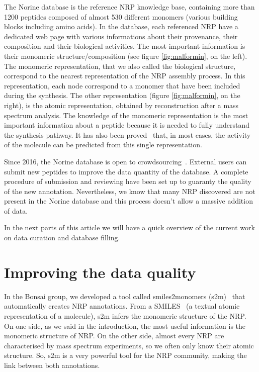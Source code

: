 \documentclass[long, final]{jobim2017}
\begin{document}
The Norine database is the reference NRP knowledge base, containing more than 1200 peptides composed of almost 530 different monomers (various building blocks including amino acids).
In the database, each referenced NRP have a dedicated web page with various informations about their provenance, their composition and their biological activities.
The most important information is their monomeric structure/composition (see figure \ref{fig:malformin}, on the left).
The monomeric representation, that we also called the biological structure, correspond to the nearest representation of the NRP assembly process.
In this representation, each node correspond to a monomer that have been included during the synthesis.
The other representation (figure \ref{fig:malformin}, on the right), is the atomic representation, obtained by reconstruction after a mass spectrum analysis.
The knowledge of the monomeric representation is the most important information about a peptide because it is needed to fully understand the synthesis pathway.
It has also been proved~\cite{abdo_new_2012} that, in most cases, the activity of the molecule can be predicted from this single representation.

Since 2016, the Norine database is open to crowdsourcing~\cite{flissi_norine_2016}.
External users can submit new peptides to improve the data quantity of the database.
A complete procedure of submission and reviewing have been set up to guaranty the quality of the new annotation.
Nevertheless, we know that many NRP discovered are not present in the Norine database and this process doesn't allow a massive addition of data.

In the next parts of this article we will have a quick overview of the current work on data curation and database filling.


\section{Improving the data quality}

In the Bonsai group, we developed a tool called smiles2monomers (s2m)~\cite{dufresne_smiles2monomers:_2015} that automatically creates NRP annotations.
From a SMILES~\cite{weininger_smiles_1988} (a textual atomic representation of a molecule), s2m infers the monomeric structure of the NRP.
On one side, as we said in the introduction, the most useful information is the monomeric structure of NRP.
On the other side, almost every NRP are characterised by mass spectrum experiments, so we often only know their atomic structure.
So, s2m is a very powerful tool for the NRP community, making the link between both annotations.
\end{document}
